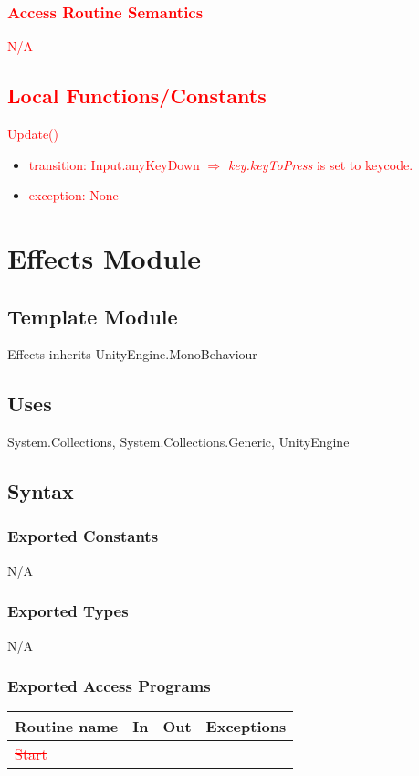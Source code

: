 \documentclass[12pt]{article}
\begin{document}
\subsubsection {\textcolor{red}{Access Routine Semantics}}
\textcolor{red}{N/A}

\subsection{\textcolor{red}{Local Functions/Constants}}
\noindent \textcolor{red}{Update()}
\begin{itemize}
    \item \textcolor{red}{transition: Input.anyKeyDown $\Rightarrow$ \textit{key.keyToPress} is set to keycode.}
    \item \textcolor{red}{exception: None}
\end{itemize}

\medskip

\newpage
\section{Effects Module}

\subsection{Template Module}
Effects inherits UnityEngine.MonoBehaviour

\subsection{Uses}
System.Collections, System.Collections.Generic, UnityEngine

\subsection{Syntax}
\subsubsection{Exported Constants}
N/A

\subsubsection{Exported Types}
N/A

\subsubsection{Exported Access Programs}
\begin{tabular}{| l | l | l | l |}
\hline
\textbf{Routine name} & \textbf{In} & \textbf{Out} & \textbf{Exceptions}\\
\hline
\textcolor{red}{\sout{Start }}   &      &           &          \\
\hline
\end{tabular}
\end{document}
